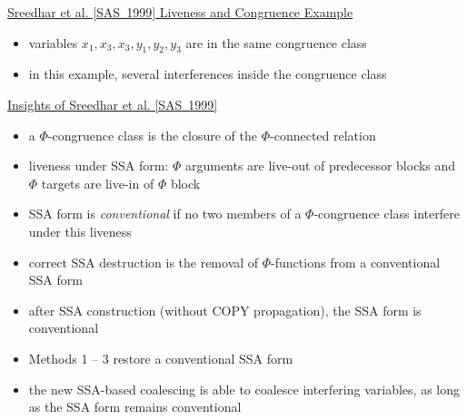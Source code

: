 \begin{center} \underline{Sreedhar et al. [SAS~1999] Liveness and Congruence Example}
\end{center}

%

\begin{itemize}

\item variables ${x_1, x_3, x_3, y_1, y_2, y_3}$ are in the same congruence class

\item in this example, several interferences inside the congruence class

\end{itemize}


\begin{center} \underline{Insights of Sreedhar et al. [SAS~1999]}
\end{center}

\begin{itemize}

\item a $\Phi$-congruence class is the closure of the $\Phi$-connected relation

\item liveness under SSA form: $\Phi$ arguments are live-out of predecessor
blocks and $\Phi$ targets are live-in of $\Phi$ block

\item SSA form is \emph{conventional} if no two members of a $\Phi$-congruence
class interfere under this liveness

\item correct SSA destruction is the removal of $\Phi$-functions from
a conventional SSA form

\item after SSA construction (without COPY propagation), the SSA form is
conventional

\item Methods 1 -- 3 restore a conventional SSA form

\item the new SSA-based coalescing is able to coalesce interfering variables, as long
as the SSA form remains conventional

\end{itemize}


